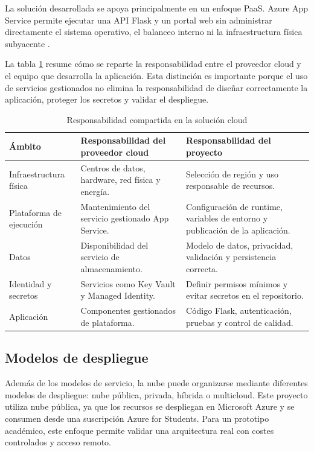 La solución desarrollada se apoya principalmente en un enfoque PaaS. Azure App Service permite ejecutar una API Flask y un portal web sin administrar directamente el sistema operativo, el balanceo interno ni la infraestructura física subyacente \cite{azure_app_service_overview}.

La tabla \ref{tabla:responsabilidad_compartida_cloud} resume cómo se reparte la responsabilidad entre el proveedor cloud y el equipo que desarrolla la aplicación. Esta distinción es importante porque el uso de servicios gestionados no elimina la responsabilidad de diseñar correctamente la aplicación, proteger los secretos y validar el despliegue.

\begin{table}[h]
\centering
\small
\begin{tabularx}{\textwidth}{l X X}
\textbf{Ámbito} & \textbf{Responsabilidad del proveedor cloud} & \textbf{Responsabilidad del proyecto} \\
\hline
Infraestructura física & Centros de datos, hardware, red física y energía. & Selección de región y uso responsable de recursos. \\
Plataforma de ejecución & Mantenimiento del servicio gestionado App Service. & Configuración de runtime, variables de entorno y publicación de la aplicación. \\
Datos & Disponibilidad del servicio de almacenamiento. & Modelo de datos, privacidad, validación y persistencia correcta. \\
Identidad y secretos & Servicios como Key Vault y Managed Identity. & Definir permisos mínimos y evitar secretos en el repositorio. \\
Aplicación & Componentes gestionados de plataforma. & Código Flask, autenticación, pruebas y control de calidad. \\
\end{tabularx}
\caption{Responsabilidad compartida en la solución cloud}
\label{tabla:responsabilidad_compartida_cloud}
\end{table}

\subsection{Modelos de despliegue}

Además de los modelos de servicio, la nube puede organizarse mediante diferentes modelos de despliegue: nube pública, privada, híbrida o multicloud. Este proyecto utiliza nube pública, ya que los recursos se despliegan en Microsoft Azure y se consumen desde una suscripción Azure for Students. Para un prototipo académico, este enfoque permite validar una arquitectura real con costes controlados y acceso remoto.

